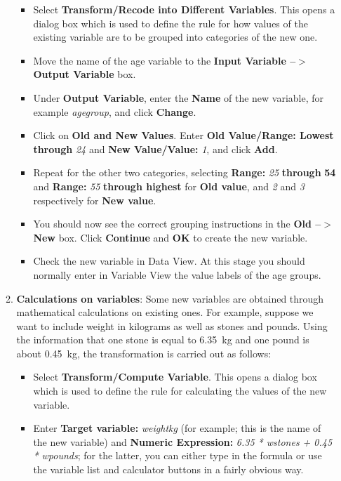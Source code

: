 \documentclass[11pt,a4paper,openany]{book}
\begin{document}
\begin{enumerate}
\begin{enumerate}
    \begin{itemize}
    \item
      Select \textbf{Transform/Recode into Different Variables}. This
      opens a dialog box which is used to define the rule for how values
      of the existing variable are to be grouped into categories of the
      new one.
    \item
      Move the name of the age variable to the \textbf{Input Variable
      --\(>\) Output Variable} box.
    \item
      Under \textbf{Output Variable}, enter the \textbf{Name} of the new
      variable, for example \emph{agegroup}, and click \textbf{Change}.
    \item
      Click on \textbf{Old and New Values}. Enter \textbf{Old
      Value/Range: Lowest through} \emph{24} and \textbf{New
      Value/Value:} \emph{1}, and click \textbf{Add}.
    \item
      Repeat for the other two categories, selecting \textbf{Range:}
      \emph{25} \textbf{through} \textbf{54} and \textbf{Range:}
      \emph{55} \textbf{through highest} for \textbf{Old value}, and
      \emph{2} and \emph{3} respectively for \textbf{New value}.
    \item
      You should now see the correct grouping instructions in the
      \textbf{Old --\(\mathbf{>}\) New} box. Click \textbf{Continue} and
      \textbf{OK} to create the new variable.
    \item
      Check the new variable in Data View. At this stage you should
      normally enter in Variable View the value labels of the age
      groups.
    \end{itemize}
  \item
    \textbf{Calculations on variables}: Some new variables are obtained
    through mathematical calculations on existing ones. For example,
    suppose we want to include weight in kilograms as well as stones and
    pounds. Using the information that one stone is equal to 6.35~kg and
    one pound is about 0.45~kg, the transformation is carried out as
    follows:

    \begin{itemize}
    \item
      Select \textbf{Transform/Compute Variable}. This opens a dialog
      box which is used to define the rule for calculating the values of
      the new variable.
    \item
      Enter \textbf{Target variable:} \emph{weightkg} (for example; this
      is the name of the new variable) and \textbf{Numeric Expression:}
      \emph{6.35 * wstones + 0.45 * wpounds}; for the latter, you can
      either type in the formula or use the variable list and calculator
      buttons in a fairly obvious way.
    \end{itemize}
  \end{enumerate}
\end{enumerate}
\end{document}
